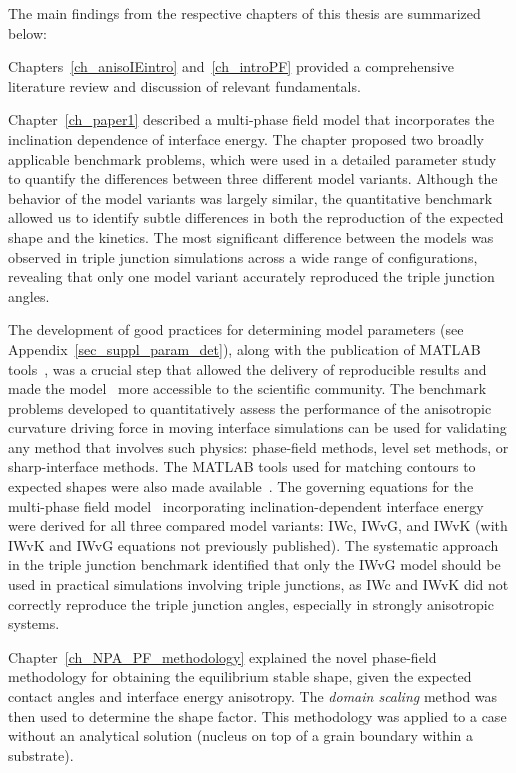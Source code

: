 The main findings from the respective chapters of this thesis are summarized below:

Chapters~\ref{ch_anisoIEintro} and~\ref{ch_introPF} provided a comprehensive literature review and discussion of relevant fundamentals.

Chapter~\ref{ch_paper1} described a multi-phase field model that incorporates the inclination dependence of interface energy. The chapter proposed two broadly applicable benchmark problems, which were used in a detailed parameter study to quantify the differences between three different model variants. Although the behavior of the model variants was largely similar, the quantitative benchmark allowed us to identify subtle differences in both the reproduction of the expected shape and the kinetics. The most significant difference between the models was observed in triple junction simulations across a wide range of configurations, revealing that only one model variant accurately reproduced the triple junction angles.

The development of good practices for determining model parameters (see Appendix~\ref{sec_suppl_param_det}), along with the publication of MATLAB tools~\cite{Minar2022dataset}, was a crucial step that allowed the delivery of reproducible results and made the model~\cite{Moelans2008} more accessible to the scientific community.
The benchmark problems developed to quantitatively assess the performance of the anisotropic curvature driving force in moving interface simulations can be used for validating any method that involves such physics: phase-field methods, level set methods, or sharp-interface methods. The MATLAB tools used for matching contours to expected shapes were also made available~\cite{Minar2022dataset}.
The governing equations for the multi-phase field model~\cite{Moelans2008} incorporating inclination-dependent interface energy were derived for all three compared model variants: IWc, IWvG, and IWvK (with IWvK and IWvG equations not previously published).
The systematic approach in the triple junction benchmark identified that only the IWvG model should be used in practical simulations involving triple junctions, as IWc and IWvK did not correctly reproduce the triple junction angles, especially in strongly anisotropic systems.

Chapter~\ref{ch_NPA_PF_methodology} explained the novel phase-field methodology for obtaining the equilibrium stable shape, given the expected contact angles and interface energy anisotropy. The \textit{domain scaling} method was then used to determine the shape factor. This methodology was applied to a case without an analytical solution (nucleus on top of a grain boundary within a substrate).

